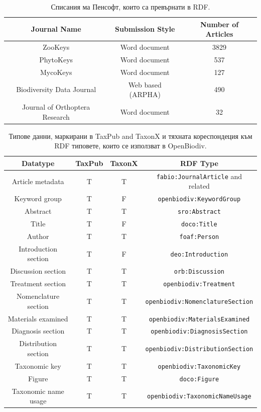 \begin{table}[h!]
\caption{Списания ма Пенсофт, които са превърнати в RDF.}
      \begin{tabular}{ccc}
        \hline
          Journal Name             & Submission Style & Number of Articles\\  \hline
          ZooKeys                 & Word document & 3829\\
          PhytoKeys               & Word document & 537\\
          MycoKeys                & Word document & 127\\
          Biodiversity Data Journal & Web based (ARPHA) & 490\\
          Journal of Orthoptera Research & Word document & 32
      \end{tabular}
      \label{rdf-pensoft-journals}
\end{table}

\begin{table}[h!]
\caption{Типове данни, маркирани в TaxPub and TaxonX и тяхната кореспондеция към RDF типовете, които се използват в OpenBiodiv.}
      \begin{tabular}{cccc}
        \hline
          Datatype             & TaxPub & TaxonX & RDF Type\\  \hline
          Article metadata     & T & T & {\tt fabio:JournalArticle} and related\\
          Keyword group        & T & F & {\tt openbiodiv:KeywordGroup} \\
          Abstract             & T & T & {\tt sro:Abstract}\\
          Title                & T & F & {\tt doco:Title} \\
          Author               & T & T & {\tt foaf:Person} \\
          Introduction section & T & F & {\tt deo:Introduction}\\
          Discussion section   & T & T & {\tt orb:Discussion}\\
          Treatment section    & T & T & {\tt openbiodiv:Treatment}\\
          Nomenclature section & T & T & {\tt openbiodiv:NomenclatureSection}\\
          Materials examined   & T & T & {\tt openbiodiv:MaterialsExamined}\\
          Diagnosis section    & T & T & {\tt openbiodiv:DiagnosisSection} \\
          Distribution section & T & T & {\tt openbiodiv:DistributionSection}\\
          Taxonomic key        & T & T & {\tt openbiodiv:TaxonomicKey}\\
          Figure               & T & T & {\tt doco:Figure}\\
          Taxonomic name usage & T & T & {\tt openbiodiv:TaxonomicNameUsage}
      \end{tabular}
      \label{datatypes-taxpub-taxonx}
\end{table}

